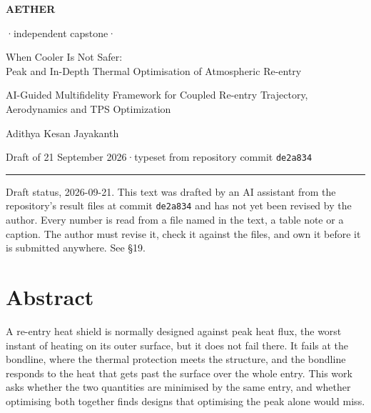 \documentclass[
  a4paper,
  11pt]{article}
\author{}
\date{}
\begin{document}
\thispagestyle{plain}
\enlargethispage{2\baselineskip}
\noindent
{\sffamily\bfseries\fontsize{9}{11}\selectfont\color{accent}AETHER}%
{\sffamily\fontsize{9}{11}\selectfont\color{inktwo}\;·\;independent capstone\;·\par}
\vspace{6pt}
{\sffamily\bfseries\fontsize{22}{26}\selectfont\color{ink}\raggedright
When Cooler Is Not Safer:\\
Peak and In-Depth Thermal Optimisation of Atmospheric Re-entry\par}
\vspace{7pt}
{\rmfamily\itshape\fontsize{12.5}{16}\selectfont\color{inktwo}\raggedright
AI-Guided Multifidelity Framework for Coupled Re-entry Trajectory, Aerodynamics and TPS Optimization\par}
\vspace{11pt}
{\sffamily\fontsize{11.5}{14}\selectfont\color{ink}Adithya Kesan Jayakanth\par}
\vspace{3pt}
{\sffamily\fontsize{9}{11}\selectfont\color{inktwo}Draft of 21 September 2026\;·\;typeset from repository commit \texttt{de2a834}\par}
\vspace{7pt}
{\color{ruleline}\rule{\linewidth}{0.6pt}\par}
\vspace{2pt}

\begin{draftbanner}
Draft status, 2026-09-21. This text was drafted by an AI assistant from
the repository's result files at commit \texttt{de2a834} and has not yet
been revised by the author. Every number is read from a file named in
the text, a table note or a caption. The author must revise it, check it
against the files, and own it before it is submitted anywhere. See §19.
\end{draftbanner}

\section{Abstract}

A re-entry heat shield is normally designed against peak heat flux, the
worst instant of heating on its outer surface, but it does not fail
there. It fails at the bondline, where the thermal protection meets the
structure, and the bondline responds to the heat that gets past the
surface over the whole entry. This work asks whether the two quantities
are minimised by the same entry, and whether optimising both together
finds designs that optimising the peak alone would miss.
\end{document}
